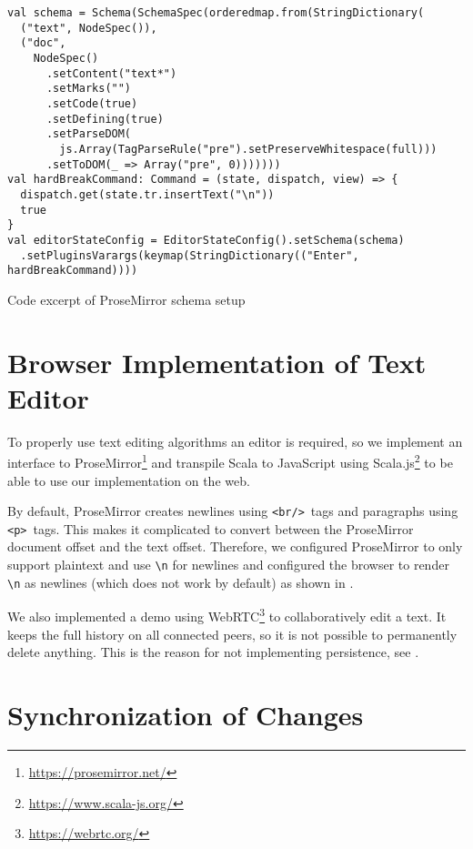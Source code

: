 \begin{listing}
  \begin{verbatim}
val schema = Schema(SchemaSpec(orderedmap.from(StringDictionary(
  ("text", NodeSpec()),
  ("doc",
    NodeSpec()
      .setContent("text*")
      .setMarks("")
      .setCode(true)
      .setDefining(true)
      .setParseDOM(
        js.Array(TagParseRule("pre").setPreserveWhitespace(full)))
      .setToDOM(_ => Array("pre", 0)))))))
val hardBreakCommand: Command = (state, dispatch, view) => {
  dispatch.get(state.tr.insertText("\n"))
  true
}
val editorStateConfig = EditorStateConfig().setSchema(schema)
  .setPluginsVarargs(keymap(StringDictionary(("Enter", hardBreakCommand))))
\end{verbatim}
  \caption{Code excerpt of ProseMirror schema setup}
  \label{lst:prosemirror-schema}
\end{listing}



\section{Browser Implementation of Text Editor} \label{section:implementation-browser}

To properly use text editing algorithms an editor is required, so we implement an interface to ProseMirror\footnote{\url{https://prosemirror.net/}} and transpile Scala to JavaScript using Scala.js\footnote{\url{https://www.scala-js.org/}} to be able to use our implementation on the web.

By default, ProseMirror creates newlines using \texttt{<br/>}~tags and paragraphs using \texttt{<p>}~tags. This makes it complicated to convert between the ProseMirror document offset and the text offset. Therefore, we configured ProseMirror to only support plaintext and use \texttt{\textbackslash n} for newlines and configured the browser to render \texttt{\textbackslash n} as newlines (which does not work by default) as shown in .

We also implemented a demo using WebRTC\footnote{\url{https://webrtc.org/}} to collaboratively edit a text. It keeps the full history on all connected peers, so it is not possible to permanently delete anything. This is the reason for not implementing persistence, see .

\section{Synchronization of Changes} \label{sec:synchronization}

